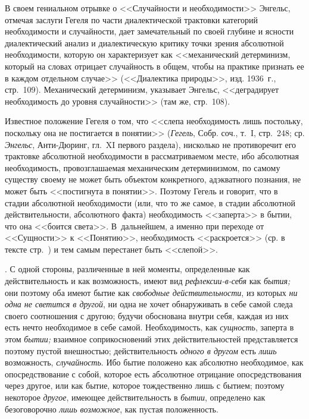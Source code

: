 {В своем гениальном отрывке о <<Случайности и необходимости>> Энгельс, отмечая
заслуги Гегеля по части диалектической трактовки категорий необходимости и
случайности, дает замечательный по своей глубине и ясности диалектический
анализ и диалектическую критику точки зрения абсолютной необходимости,
которую он характеризует как <<механический детерминизм, который на словах
отрицает случайность в общем, чтобы на практике признать ее в каждом
отдельном случае>> (<<Диалектика природы>>, изд. 1936~г., стр.~109).
Механический детерминизм, указывает Энгельс, <<деградирует необходимость до
уровня случайности>> (там же, стр.~108).

Известное положение Гегеля о том, что <<слепа необходимость лишь постольку,
поскольку она не постигается в понятии>> ({\em Гегель}, Собр. соч., т.~I,
стр.~248; ср. {\em Энгельс}, Анти-Дюринг, гл.~XI первого раздела),
нисколько не противоречит его трактовке абсолютной необходимости в
рассматриваемом месте, ибо абсолютная необходимость, провозглашаемая
механическим детерминизмом, по самому существу своему не может быть
объектом конкретного, адэкватного познания, не может быть <<постигнута в
понятии>>. Поэтому Гегель и говорит, что в стадии абсолютной необходимости
(или, что то же самое, в стадии абсолютной действительности, абсолютного
факта) необходимость <<заперта>> в бытии, что она <<боится света>>.
В~дальнейшем, а именно при переходе от <<Сущности>> к <<Понятию>>,
необходимость <<раскроется>> (ср. в тексте стр.~\pageref{bkm:bm93a}) и тем
самым перестанет быть <<слепой>>.}.
С одной стороны, различенные в ней моменты, определенные как
действительность и как возможность, имеют вид
{\em рефлексии-в-себя} как {\em бытия;} они поэтому оба имеют бытие как
{\em свободные действительности}, из которых
{\em ни одна не светится в другой}, ни одна не хочет
обнаруживать в себе самой следа своего соотношения с другою; будучи
обоснована внутри себя, каждая из них есть нечто необходимое в себе самой.
Необходимость, как {\em сущность}, заперта в этом
{\em бытии;} взаимное соприкосновений этих
действительностей представляется поэтому пустой внешностью;
действительность {\em одного в другом} есть {\em лишь} возможность,
{\em случайность}. Ибо бытие положено как абсолютно
необходимое, как опосредствование с собой, которое есть абсолютное
отрицание опосредствования через другое, или как бытие, которое
тождественно лишь с бытием; поэтому некоторое
{\em другое}, имеющее действительность в
{\em бытии}, определено как безоговорочно
{\em лишь возможное}, как пустая положенность.

